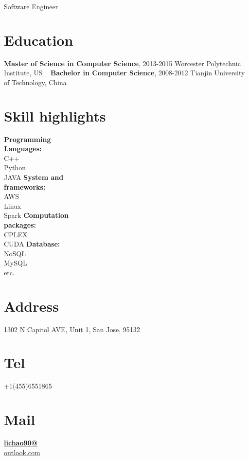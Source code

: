 \documentclass[]{friggeri-cv}
\begin{document}
{Software Engineer}


\begin{aside}
	\section{Education}
	\textbf{Master of Science in 
	Computer Science}, 
	2013-2015
	Worcester Polytechnic 
	Institute, US
	~
	\textbf{Bachelor in 
	Computer Science}, 
	2008-2012
	Tianjin University of 
	Technology, China
	\section{Skill highlights}
	\textbf{Programming \\Languages:} \\ C++\\Python\\ JAVA
	\textbf{System and \\frameworks:} \\AWS\\ Linux\\ Spark 
	\textbf{Computation \\packages:} \\CPLEX\\ CUDA
	\textbf{Database:} \\NoSQL\\ MySQL\\ etc.
	~
	\section{Address}
	1302 N Capitol AVE,
	Unit 1,
	San Jose, 95132
	\section{Tel}
	+1(455)6551865
	\section{Mail}
	\href{mailto:lichao90@outlook.com}{\textbf{lichao90@}\\outlook.com}
	~

\end{aside}
\end{document}
